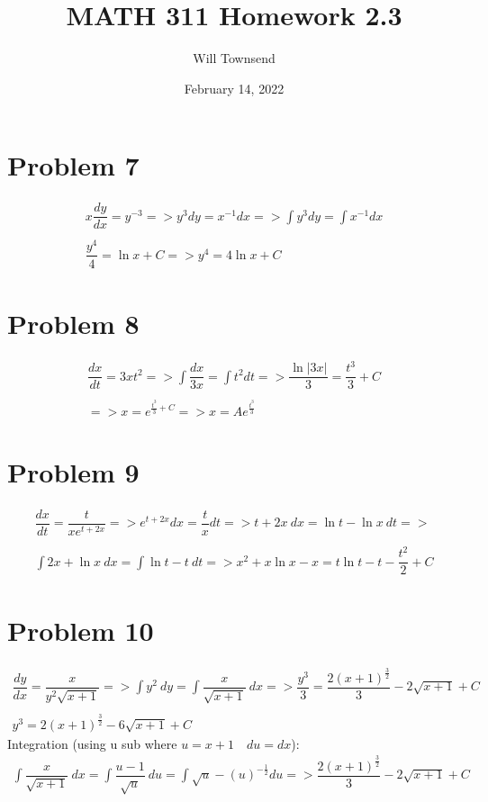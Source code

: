 \documentclass[12pt]{exam}
\title{\textbf{MATH 311 Homework 2.3}}
\author{Will Townsend}
\date{February 14, 2022}
\begin{document}
\maketitle

\section*{Problem 7}
\large\begin{eqnarray*}
    x\dfrac{dy}{dx}=y^{-3}=>y^3dy=x^{-1}dx=>\int y^3dy=\int x^{-1}dx\\\\
    \dfrac{y^4}{4}=\ln{x}+C=>y^4=4\ln{x}+C
\end{eqnarray*}
\section*{Problem 8}
\large\begin{eqnarray*}
    \dfrac{dx}{dt}=3xt^2=>\int\dfrac{dx}{3x}=\int t^2dt=>
    \dfrac{\ln{|3x|}}{3}=\dfrac{t^3}{3}+C\\\\
    =>x=e^{\frac{t^3}{3}+C}=>x=Ae^{\frac{t^3}{3}}
\end{eqnarray*}
\section*{Problem 9}
\large\begin{eqnarray*}
    \dfrac{dx}{dt}=\dfrac{t}{xe^{t+2x}}=>e^{t+2x}dx=\dfrac{t}{x}dt
    =>t+2x\:dx=\ln{t}-\ln{x}\:dt=>\\\\
    \int 2x+\ln{x}\:dx=\int\ln{t}-t\:dt=>x^2+x\ln{x}-x=t\ln{t}-t-\dfrac{t^2}{2}+C
\end{eqnarray*}
\pagebreak
\section*{Problem 10}
\large\begin{eqnarray*}
    \dfrac{dy}{dx}=\dfrac{x}{y^2\sqrt{x+1}}=>\int y^2\:dy= \int\dfrac{x}{\sqrt{x+1}}\:dx=>\dfrac{y^3}{3}= \dfrac{2(x+1)^\frac{3}{2}}{3}-2\sqrt{x+1}+C\\\\
    y^3=2(x+1)^\frac{3}{2}-6\sqrt{x+1}+C
\end{eqnarray*}
Integration (using u sub where $u=x+1\quad du=dx$):
\large\begin{eqnarray*}
    \int\dfrac{x}{\sqrt{x+1}}\:dx=\int\dfrac{u-1}{\sqrt{u}}\:du
    =\int\sqrt{u}-(u)^{-\frac{1}{2}}du=>\dfrac{2(x+1)^\frac{3}{2}}{3}-2\sqrt{x+1}+C\\
\end{eqnarray*}
\end{document}
